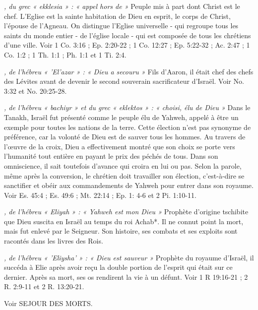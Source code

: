 \begin{multicols}{2}
{\textit{, du grec « ekklesia » : « appel hors de »}\newline
Peuple mis à part dont Christ est le chef. L'Eglise est la sainte habitation de Dieu en esprit, le corps de Christ, l'épouse de l'Agneau. On distingue l'Eglise universelle - qui regroupe tous les saints du monde entier - de l'église locale - qui est composée de tous les chrétiens d'une ville. Voir 1 Co. 3:16 ; Ep. 2:20-22 ; 1 Co. 12:27 ; Ep. 5:22-32 ; Ac. 2:47 ; 1 Co. 1:2 ; 1 Th. 1:1 ; Ph. 1:1 et 1 Ti. 2:4.

\textit{, de l'hébreu « 'El'azar » : « Dieu a secouru »}\newline
Fils d'Aaron, il était chef des chefs des Lévites avant de devenir le second souverain sacrificateur d'Israël. Voir No. 3:32 et No. 20:25-28.

\textit{, de l'hébreu « bachiyr » et du grec « eklektos » : « choisi, élu de Dieu »}\newline
Dans le Tanakh, Israël fut présenté comme le peuple élu de Yahweh, appelé à être un exemple pour toutes les nations de la terre. Cette élection n'est pas synonyme de préférence, car la volonté de Dieu est de sauver tous les hommes. Au travers de l'œuvre de la croix, Dieu a effectivement montré que son choix se porte vers l'humanité tout entière en payant le prix des péchés de tous. Dans son omniscience, il sait toutefois d'avance qui croira en lui ou pas. Selon la parole, même après la conversion, le chrétien doit travailler son élection, c'est-à-dire se sanctifier et obéir aux commandements de Yahweh pour entrer dans son royaume. Voir Es. 45:4 ; Es. 49:6 ; Mt. 22:14 ; Ep. 1: 4-6 et 2 Pi. 1:10-11.

\textit{, de l'hébreu « Eliyah » : « Yahweh est mon Dieu »}\newline
Prophète d'origine tschibite que Dieu suscita en Israël au temps du roi Achab*. Il ne connut point la mort, mais fut enlevé par le Seigneur. Son histoire, ses combats et ses exploits sont racontés dans les livres des Rois.

\textit{, de l'hébreu « 'Eliysha' » : « Dieu est sauveur »}\newline
Prophète du royaume d'Israël, il succéda à Elie après avoir reçu la double portion de l'esprit qui était sur ce dernier. Après sa mort, ses os rendirent la vie à un défunt. Voir 1 R 19:16-21 ; 2 R. 2:9-11 et 2 R. 13:20-21.

\textit{}\newline
Voir SEJOUR DES MORTS.

}
\end{multicols}
